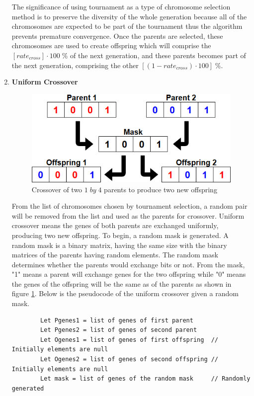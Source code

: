 \begin{enumerate}
                    The significance of using tournament as a type of chromosome selection method is to preserve the diversity of the whole generation because all of the chromosomes are expected to be part of the tournament thus the algorithm prevents premature convergence. Once the parents are selected, these chromosomes are used to create offspring which will comprise the $[rate_{cross}]\cdot100\;\%$ of the next generation, and these parents becomes part of the next generation, comprising the other $[(1-rate_{cross})\cdot100]\;\%$.
                
                \item \textbf{Uniform Crossover}
                    \begin{figure}[h]
                        \centering
                        \includegraphics[width=130mm]{Figures/crossover.png}
                        \caption{Crossover of two $1\;by\;4$ parents to produce two new offspring}
                        \label{crossover}
                    \end{figure}
                    \par From the list of chromosomes chosen by tournament selection, a random pair will be removed from the list and used as the parents for crossover. Uniform crossover means the genes of both parents are exchanged uniformly, producing two new offspring. To begin, a random mask is generated. A random mask is a binary matrix, having the same size with the binary matrices of the parents having random elements. The random mask determines whether the parents would exchange bits or not. From the mask, "1" means a parent will exchange genes for the two offspring while "0" means the genes of the offspring will be the same as of the parents as shown in figure \ref{crossover}. Below is the pseudocode of the uniform crossover given a random mask.
                    
        \singlespacing
        \begin{lstlisting}
        Let Pgenes1 = list of genes of first parent
        Let Pgenes2 = list of genes of second parent
        Let Ogenes1 = list of genes of first offspring  // Initially elements are null
        Let Ogenes2 = list of genes of second offspring // Initially elements are null
        Let mask = list of genes of the random mask     // Randomly generated
        

\end{lstlisting}
\end{enumerate}
